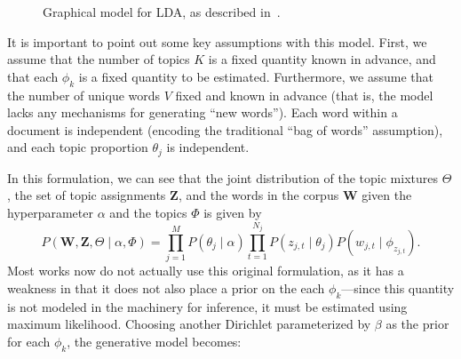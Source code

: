 \documentclass[11pt]{article}
\begin{document}
\begin{figure}[H]
  \begin{center}
  \end{center}
  \caption{Graphical model for LDA, as described in~\cite{Blei:2003:LDA}.}
  \label{fig:ldamodel}
\end{figure}

It is important to point out some key assumptions with this model. First,
we assume that the number of topics $K$ is a fixed quantity known in
advance, and that each $\phi_k$ is a fixed quantity to be estimated.
Furthermore, we assume that the number of unique words $V$ fixed and known
in advance (that is, the model lacks any mechanisms for generating ``new
words'').  Each word within a document is independent (encoding the
traditional ``bag of words'' assumption), and each topic proportion
$\theta_j$ is independent.

In this formulation, we can see that the joint distribution of the topic
mixtures $\Theta$, the set of topic assignments $\mathbf{Z}$, and the words
in the corpus $\mathbf{W}$ given the hyperparameter $\alpha$ and the topics
$\Phi$ is given by
\begin{equation}
  P(\mathbf{W}, \mathbf{Z}, \Theta \mid \alpha, \Phi)
  = \prod_{j=1}^M P(\theta_j \mid \alpha)
  \prod_{t=1}^{N_j} P(z_{j,t} \mid \theta_j) P(w_{j,t} \mid
  \phi_{z_{j,t}}).
  \label{eqn:fulljoint}
\end{equation}
Most works now do not actually use this original formulation, as it has a
weakness in that it does not also place a prior on the each
$\phi_k$---since this quantity is not modeled in the machinery for
inference, it must be estimated using maximum likelihood. Choosing another
Dirichlet parameterized by $\beta$ as the prior for each $\phi_k$, the
generative model becomes:
\end{document}
